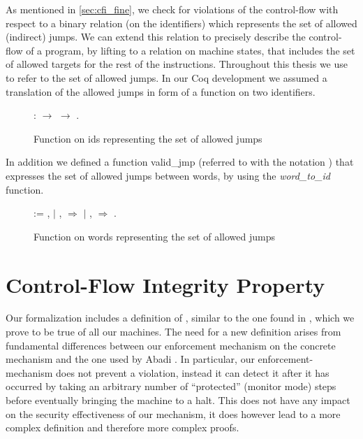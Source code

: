 
As mentioned in \ref{sec:cfi_fine}, we check for violations of the
control-flow with respect to a binary relation (on the identifiers)
\CFG which represents the set of allowed (indirect) jumps. We can
extend this relation to precisely describe the control-flow of a
program, by lifting \CFG to a relation \SUCC{} on machine states, that
includes the set of allowed targets for the rest of the
instructions. Throughout this thesis we use \CFG to refer to the set
of allowed jumps. In our Coq development we assumed a translation of
the allowed jumps in form of a function on two identifiers.

\begin{figure}[H]
    : 
  \ensuremath{\rightarrow}  \ensuremath{\rightarrow}
  .\coqdoceol
\caption{Function on ids representing the set of allowed jumps}
\label{fig:cfg}
\end{figure}

In addition we defined a function valid\_jmp (referred to with the
notation \J) that expresses the set of allowed jumps between words, by
using the \emph{word\_to\_id} function.

\begin{figure}[H]
    
   :=\coqdoceol \coqdocindent{1.00em} 
   , 
   \coqdoceol \coqdocindent{2.00em}
  \ensuremath{|}  , 
   \ensuremath{\Rightarrow} 
   \coqdoceol \coqdocindent{2.00em}
  \ensuremath{|} \coqdocvar{\_}, \coqdocvar{\_}
  \ensuremath{\Rightarrow} \coqdoceol
  \coqdocindent{1.00em} .\coqdoceol
\caption{Function on words representing the set of allowed jumps}
\label{fig:valid_jmp}
\end{figure}


\section{Control-Flow Integrity Property}\label{sec:cfi_property}

Our formalization includes a definition of \CFI, similar to the one found in
\cite{AbadiBEL09}, which we prove to be true of all our machines. The need for a
new definition arises from fundamental differences between our enforcement
mechanism on the concrete mechanism and the one used by Abadi \ETAL. In
particular, our enforcement-mechanism does not prevent a violation, instead
it can detect it after it has occurred by taking an arbitrary number of
``protected'' (monitor mode) steps before eventually bringing the machine to a
halt. This does not have any impact on the security effectiveness of our
mechanism, it does however lead to a more complex definition and therefore
more complex proofs.

